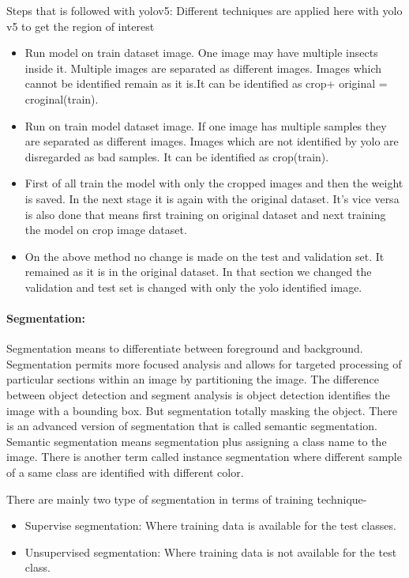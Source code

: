 Steps that is followed with yolov5:
Different techniques are applied here with yolo v5 to get the region of interest  
\begin{itemize}
    \item Run model on train dataset image. One image may have multiple insects inside it. Multiple images are separated as different images. Images which cannot be identified remain as it is.It can be identified as crop+ original = croginal(train).
    \item Run on train model dataset image. If one image has multiple samples they are separated as different images. Images which are not identified by yolo are disregarded as bad samples. It can be identified as crop(train).
    \item First of all train the model with only the cropped images and then the weight is saved. In the next stage it is again with the original dataset. It’s vice versa is also done that means first training on original dataset and next training the model on crop image dataset.
    \item On the above method no change is made on the test and validation set. It remained as it is in the original dataset. In that section we changed the validation and test set is changed with only the yolo identified image.
\end{itemize}


\paragraph{Segmentation:}
Segmentation means to differentiate between foreground and background. Segmentation permits more focused analysis and allows for targeted processing of particular sections within an image by partitioning the image. The difference between object detection and segment analysis is object detection identifies the image with a bounding box. But segmentation totally masking the object. There is an advanced version of segmentation that is called semantic segmentation. Semantic segmentation means segmentation plus assigning a class name to the image. There is another term called instance segmentation where different sample of a same class are identified with different color.

There are mainly two type of segmentation in terms of training technique-
\begin{itemize}
    \item Supervise segmentation: Where training data is available for the test classes.
    \item Unsupervised segmentation: Where training data is not available for the test class.
    
\end{itemize}

